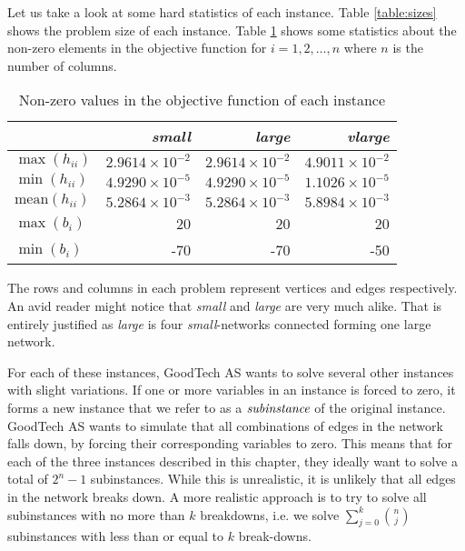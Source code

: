 Let us take a look at some hard statistics of each instance.
Table \ref{table:sizes} shows the problem size of each instance.
Table \ref{table:maxmin} shows some statistics about the non-zero elements in
the objective function for $i = 1,2,\ldots,n$ where $n$ is the number of
columns.
\begin{table}
    \centering
    \caption{Non-zero values in the objective function of each instance}
    \begin{tabular}{lrrr}
                        & \textit{small}          & \textit{large}          & \textit{vlarge} \\\hline
    $\max(h_{ii})$      & $2.9614 \times 10^{-2}$ & $2.9614 \times 10^{-2}$ & $4.9011 \times 10^{-2}$ \\
    $\min(h_{ii})$      & $4.9290 \times 10^{-5}$ & $4.9290 \times 10^{-5}$ & $1.1026 \times 10^{-5}$ \\
$\textrm{mean}(h_{ii})$ & $5.2864 \times 10^{-3}$ & $5.2864 \times 10^{-3}$ & $5.8984 \times 10^{-3}$ \\
    $\max(b_{i})$       & 20                      & 20                      & 20 \\
    $\min(b_{i})$       & -70                     & -70                     & -50 \\
    \end{tabular}
    \label{table:maxmin}
\end{table}
The rows and columns in each problem represent vertices and edges respectively.
An avid reader might notice that \textit{small} and \textit{large} are very
much alike.
That is entirely justified as \textit{large} is four \textit{small}-networks
connected forming one large network.

For each of these instances, GoodTech AS wants to solve several other instances
with slight variations.
If one or more variables in an instance is forced to zero, it forms a new
instance that we refer to as a $\emph{subinstance}$ of the original instance.
GoodTech AS wants to simulate that all combinations of edges in the network
falls down, by forcing their corresponding variables to zero.
This means that for each of the three instances described in this chapter,
they ideally want to solve a total of $2^n - 1$ subinstances. While this is
unrealistic, it is unlikely that all edges in the network breaks down.
A more realistic approach is to try to solve all subinstances with no more than
$k$ breakdowns, i.e. we solve $\sum_{j=0}^k {n \choose j}$ subinstances with
less than or equal to $k$ break-downs.
